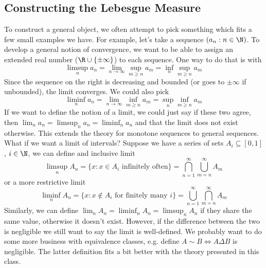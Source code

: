 \subsection{Constructing the Lebesgue Measure}
To construct a general object, we often attempt to pick something which fits a few small examples we have. For example, let's
take a sequence $(a_n: n \in \N)$. To develop a general notion of convergence, we
want to be able to assign an extended real number ($\R \cup \{\pm\infty\}$) to each sequence. One way to do that is with
\[ \limsup_n a_n = \lim_{n \to \infty} \sup_{m \geq n} a_m = \inf_n \sup_{m \geq n} a_m \]
Since the sequence on the right is decreasing and bounded (or goes to $\pm \infty$ if unbounded), the limit converges. We could also pick
\[ \liminf_n a_n = \lim_{n \to \infty} \inf_{m \geq n} a_m = \sup_n \inf_{m \geq n} a_m\]
If we want to define the notion of a limit, we could just say if these two agree, then $\lim_n a_n = \limsup_n a_n = \liminf_n a_n$
and that the limit does not exist otherwise. This extends the theory for monotone sequences to general sequences. What if we want a limit of
intervals? Suppose we have a series of sets $A_i \subseteq [0, 1]$, $i \in \N$, we can define
and inclusive limit
\[ \limsup_n A_n = \{x : x \in A_i \text{ infinitely often}\} = \bigcap_{n = 1}^{\infty} \bigcup_{m = n}^{\infty} A_m\]
or a more restrictive limit
\[ \liminf_n A_n = \{x: x \notin A_i \text{ for finitely many $i$}\} = \bigcup_{n = 1}^{\infty} \bigcap_{m = n}^{\infty} A_m \]
Similarly, we can define $\lim_n A_n = \liminf_n A_n = \limsup_n A_n$ if they share the same value, otherwise it doesn't exist.
However, if the difference between the two is negligible we still want to say the limit is well-defined. We probably want to do
some more business with equivalence classes, e.g. define $A \sim B \iff A \Delta B$ is negligible. The latter definition fits a bit better with the
theory presented in this class.